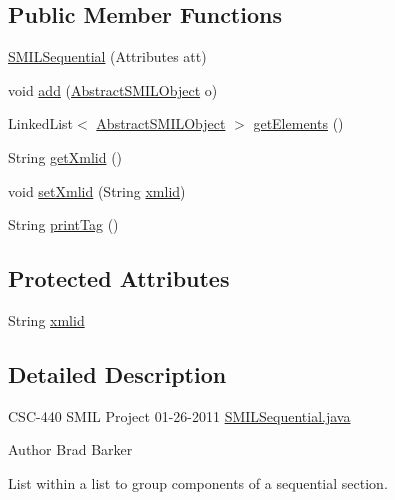 \subsection*{Public Member Functions}
\begin{DoxyCompactItemize}
\item 
\hyperlink{classcsc440_1_1nuf_1_1components_1_1_s_m_i_l_sequential_a3c5284fa22cb41fc82ee96c140fdd54c}{S\-M\-I\-L\-Sequential} (Attributes att)
\item 
void \hyperlink{classcsc440_1_1nuf_1_1components_1_1_s_m_i_l_sequential_a176c8fea4dad1bdc8dfee6b66a9d0f08}{add} (\hyperlink{classcsc440_1_1nuf_1_1components_1_1_abstract_s_m_i_l_object}{Abstract\-S\-M\-I\-L\-Object} o)
\item 
Linked\-List$<$ \hyperlink{classcsc440_1_1nuf_1_1components_1_1_abstract_s_m_i_l_object}{Abstract\-S\-M\-I\-L\-Object} $>$ \hyperlink{classcsc440_1_1nuf_1_1components_1_1_s_m_i_l_sequential_ae7877c94ee5c20a8cd676c3bae9d1888}{get\-Elements} ()
\item 
String \hyperlink{classcsc440_1_1nuf_1_1components_1_1_s_m_i_l_sequential_ab6bd413f3a5c0842d0647f763ade9b44}{get\-Xmlid} ()
\item 
void \hyperlink{classcsc440_1_1nuf_1_1components_1_1_s_m_i_l_sequential_a0ed7bf2774e872936435ac3256a7d894}{set\-Xmlid} (String \hyperlink{classcsc440_1_1nuf_1_1components_1_1_s_m_i_l_sequential_ab1908eebf82db38cfed5f892721e4c8e}{xmlid})
\item 
String \hyperlink{classcsc440_1_1nuf_1_1components_1_1_s_m_i_l_sequential_a5fae7e91919070144cf29337eee45b6f}{print\-Tag} ()
\end{DoxyCompactItemize}
\subsection*{Protected Attributes}
\begin{DoxyCompactItemize}
\item 
String \hyperlink{classcsc440_1_1nuf_1_1components_1_1_s_m_i_l_sequential_ab1908eebf82db38cfed5f892721e4c8e}{xmlid}
\end{DoxyCompactItemize}


\subsection{Detailed Description}
C\-S\-C-\/440 S\-M\-I\-L Project 01-\/26-\/2011 \hyperlink{_s_m_i_l_sequential_8java}{S\-M\-I\-L\-Sequential.\-java} \begin{DoxyAuthor}{Author}
Brad Barker
\end{DoxyAuthor}
List within a list to group components of a sequential section. 

